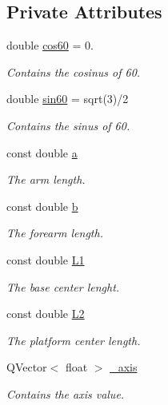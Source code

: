 \subsection*{Private Attributes}
\begin{DoxyCompactItemize}
\item 
double \hyperlink{class_servo_thread_a5254b08335f14de98d18aed01abc6f58}{cos60} = 0.
\begin{DoxyCompactList}\small\item\em Contains the cosinus of 60. \end{DoxyCompactList}\item 
double \hyperlink{class_servo_thread_addbe4545236e5ded8c4956f2e2d52a84}{sin60} = sqrt(3)/2
\begin{DoxyCompactList}\small\item\em Contains the sinus of 60. \end{DoxyCompactList}\item 
const double \hyperlink{class_servo_thread_a7dc3998d380d61406fe4485f9872edff}{a}
\begin{DoxyCompactList}\small\item\em The arm length. \end{DoxyCompactList}\item 
const double \hyperlink{class_servo_thread_a14f03febaa39a60b9bf7ff9b9151060c}{b}
\begin{DoxyCompactList}\small\item\em The forearm length. \end{DoxyCompactList}\item 
const double \hyperlink{class_servo_thread_a6281142e50115dd8c914c14cfae6f90d}{L1}
\begin{DoxyCompactList}\small\item\em The base center lenght. \end{DoxyCompactList}\item 
const double \hyperlink{class_servo_thread_a3d51c16b1f498b48a6ecbfaadaba6ed2}{L2}
\begin{DoxyCompactList}\small\item\em The platform center length. \end{DoxyCompactList}\item 
Q\+Vector$<$ float $>$ \hyperlink{class_servo_thread_aad24ef961ee39dd35766c725c13b11b7}{\+\_\+axis}
\begin{DoxyCompactList}\small\item\em Contains the axis value. \end{DoxyCompactList}\item 

\end{DoxyCompactItemize}
